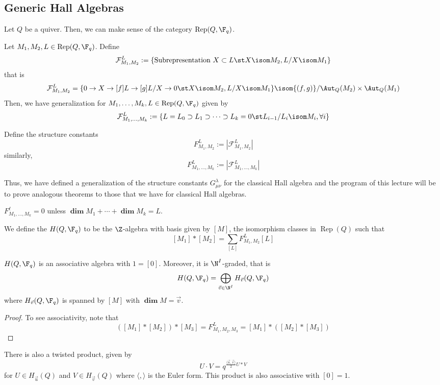\documentclass[11pt,leqno,oneside]{amsbook}
\numberwithin{thm}{section}
\newcommand{\Rep}{\operatorname{Rep}} %
\renewcommand{\Q}{Q} %
\newcommand{\grdim}{\boldsymbol{\dim}} %
\newcommand{\cF}{\mathcal{F}} %
\begin{document}
\subsection{Generic Hall Algebras}
Let \(\Q\) be a quiver. Then, we can make sense of the category
\(\Rep(\Q,\F_q)\).
\begin{defn}
  Let \(M_1, M_2, L \in \Rep(\Q,\F_q)\). Define \[
    \cF_{M_1, M_2}^L := \{\text{Subrepresentation }X \subset L \st X
    \isom M_2, L/X \isom M_1\}
  \]
  that is \[
    \cF_{M_1, M_2}^L = \{0 \to X \to[f] L \to[g] L/X \to 0 \st X \isom
    M_2, L/X \isom M_1\} \isom \{(f,g)\}/\Aut_\Q(M_2) \times \Aut_\Q(M_1)
  \]
  Then, we have generalization for \(M_1, \ldots, M_k, L \in
  \Rep(\Q,\F_q)\) given by \[
    \cF_{M_1, \ldots, M_k}^L := \{L = L_0 \supset L_1 \supset \cdots
    \supset L_k = 0 \st L_{i-1}/L_i \isom M_i, \forall i\}
  \]
\end{defn}
\begin{defn}
  Define the structure constants \[
    F_{M_1,M_2}^L := |\cF_{M_1,M_2}^L|
  \]
  similarly, \[
    F_{M_1, \ldots, M_k}^L := | \cF_{M_1, \ldots, M_k}^L |
  \]
\end{defn}
Thus, we have defined a generalization of the structure constants
\(G_{\mu \nu}^\lambda\) for
the classical Hall algebra and the program of this lecture will be to
prove analogous theorems to those that we have for classical Hall
algebras.
\begin{prop}
  \(F_{M_1, \ldots, M_k}^\ell = 0\) unless \(\grdim M_1 + \cdots +
  \grdim M_k = L\). 
\end{prop}
\begin{defn}
  We define the  \(H(\Q,\F_q)\) to be the
  \(\Z\)-algebra with basis given by \([M]\), the isomorphism classes
  in \(\Rep(\Q)\) such that \[
    [M_1] * [M_2] = \sum_{[L]} F_{M_1,M_2}^L [L]
  \]
\end{defn}
\begin{prop}
  \(H(\Q,\F_q)\) is an associative algebra with \(1 = [0]\). Moreover,
  it is \(\N^I\)-graded, that is \[
    H(\Q,\F_q) = \bigoplus_{\vec{v} \in \N^I} H_{\vec{v}} (\Q,\F_q)
  \]
  where \(H_{\vec{v}}(\Q,\F_q)\) is spanned by \([M]\) with \(\grdim M =
  \vec{v}\). 
\end{prop}
\begin{proof}
  To see associativity, note that \[
    ([M_1] * [M_2]) * [M_3] = F_{M_1, M_2, M_3}^L = [M_1]
    * ([M_2] * [M_3])
  \]
\end{proof}
\begin{rmk}
  There is also a twisted product, given by \[
    U \cdot V = q^{\frac{\langle \vec{u}, \vec{v} \rangle}{2} U * V}
  \]
   for \(U \in H_{\vec{u}}(\Q)\) and \(V \in H_{\vec{v}}(\Q)\) where
   \(\langle , \rangle\) is the Euler form. This product is also
   associative with \([0]=1\).
\end{rmk}
\end{document}
